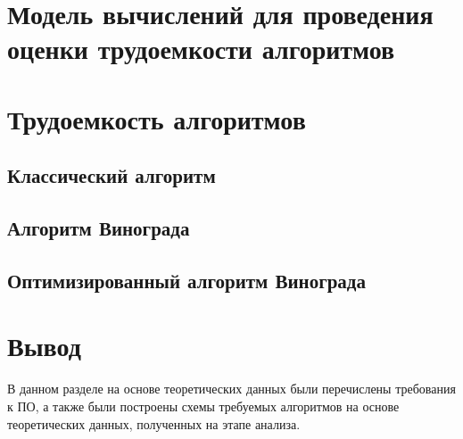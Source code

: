 \section{Модель вычислений для проведения оценки трудоемкости алгоритмов}

\section{Трудоемкость алгоритмов}

\subsection*{Классический алгоритм}
\subsection*{Алгоритм Винограда}
\subsection*{Оптимизированный алгоритм Винограда}
	
\section*{Вывод}

В данном разделе на основе теоретических данных были перечислены требования к ПО, а также были построены схемы требуемых алгоритмов на основе теоретических данных, полученных на этапе анализа.